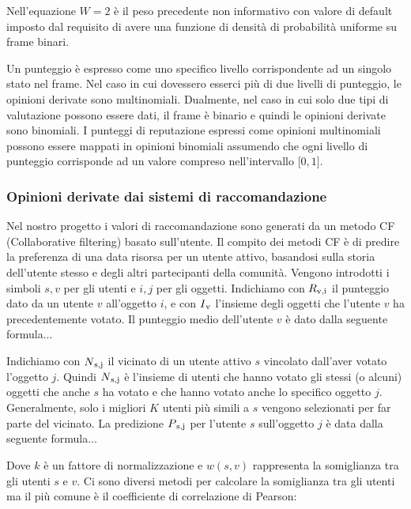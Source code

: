 \documentclass{report}
\begin{document}
	Nell'equazione $W = 2$ è il peso precedente non informativo con valore di
	default imposto dal requisito di avere una funzione di densità di
	probabilità uniforme su frame binari.
	
	Un punteggio è espresso come uno specifico livello corrispondente ad un
	singolo stato nel frame. Nel caso in cui dovessero esserci più di due
	livelli di punteggio, le opinioni derivate sono multinomiali. Dualmente,
	nel caso in cui solo due tipi di valutazione possono essere dati, il
	frame è binario e quindi le opinioni derivate sono binomiali. I punteggi
	di reputazione espressi come opinioni multinomiali possono essere
	mappati in opinioni binomiali assumendo che ogni livello di punteggio
	corrisponde ad un valore compreso nell'intervallo ${[}0,1{]}$.
	
	\hypertarget{header-n108}{%
		\subsubsection{Opinioni derivate dai sistemi di
			raccomandazione}\label{header-n108}}
	
	Nel nostro progetto i valori di raccomandazione sono generati da un
	metodo CF (Collaborative filtering) basato sull'utente. Il compito dei
	metodi CF è di predire la preferenza di una data risorsa per un utente
	attivo, basandosi sulla storia dell'utente stesso e degli altri
	partecipanti della comunità. Vengono introdotti i simboli $s,v$ per gli
	utenti e $i,j$ per gli oggetti. Indichiamo con $R\textsubscript{v,i}$ il punteggio dato da
	un utente $v$ all'oggetto $i$, e con $I\textsubscript{v}$ l'insieme degli oggetti che l'utente
	$v$ ha precedentemente votato. Il punteggio medio dell'utente $v$ è dato
	dalla seguente formula...
	
	Indichiamo con $N\textsubscript{s,j}$ il vicinato di un utente attivo $s$ vincolato
	dall'aver votato l'oggetto $j$. Quindi $N\textsubscript{s,j}$ è l'insieme di utenti che
	hanno votato gli stessi (o alcuni) oggetti che anche $s$ ha votato e che
	hanno votato anche lo specifico oggetto $j$. Generalmente, solo i migliori
	$K$ utenti più simili a $s$ vengono selezionati per far parte del vicinato.
	La predizione $P\textsubscript{s,j}$ per l'utente $s$ sull'oggetto $j$ è data dalla seguente
	formula...
	
	Dove $k$ è un fattore di normalizzazione e $w(s,v)$ rappresenta la
	somiglianza tra gli utenti $s$ e $v$. Ci sono diversi metodi per calcolare
	la somiglianza tra gli utenti ma il più comune è il coefficiente di
	correlazione di Pearson:
	
\end{document}
